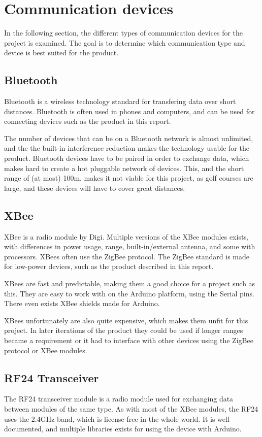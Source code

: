\section{Communication devices}
In the following section, the different types of communication devices for the project is examined. The goal is to determine which communication type and device is best suited for the product.

\subsection{Bluetooth}
Bluetooth is a wireless technology standard for transfering data over short distances. Bluetooth is often used in phones and computers, and can be used for connecting devices such as the product in this report.

The number of devices that can be on a Bluetooth network is almost unlimited, and the the built-in interference reduction makes the technology usable for the product.
Bluetooth devices have to be paired in order to exchange data, which makes hard to create a hot pluggable network of devices. This, and the short range of (at most) 100m\cite{bluetoothbasics}. makes it not viable for this project, as golf courses are large, and these devices will have to cover great distances.

\subsection{XBee}
XBee is a radio module by Digi. Multiple versions of the XBee modules exists, with differences in power usage, range, built-in/external antenna, and some with processors\cite{sparkfunXbeeGuide}.
XBees often use the ZigBee protocol. The ZigBee standard is made for low-power devices, such as the product described in this report\cite{zigbee}.

XBees are fast and predictable, making them a good choice for a project such as this. They are easy to work with on the Arduino platform, using the Serial pins. There even exists XBee shields made for Arduino.

XBees unfortunately are also quite expensive, which makes them unfit for this project. In later iterations of the product they could be used if longer ranges became a requirement or it had to interface with other devices using the ZigBee protocol or XBee modules.


\subsection{RF24 Transceiver}
The RF24 transceiver module is a radio module used for exchanging data between modules of the same type. As with most of the XBee modules, the RF24 uses the 2.4GHz band, which is license-free in the whole world. It is well documented, and multiple libraries exists for using the device with Arduino.

